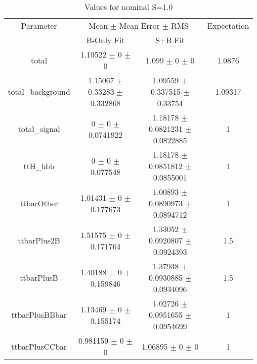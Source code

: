 \begin{table}
\centering
\caption{Values for nominal S=1.0}
\begin{tabular}{cccc}
\toprule
Parameter & \multicolumn{2}{c}{Mean $\pm$ Mean Error $\pm$ RMS} & Expectation\\
 & B-Only Fit & S+B Fit & \\
\midrule
total & \num{1.10522} $\pm$ \num{0} $\pm$ \num{0} & \num{1.099} $\pm$ \num{0} $\pm$ \num{0} & \num{1.0876}\\
total\_background & \num{1.15067} $\pm$ \num{0.33283} $\pm$ \num{0.332868} & \num{1.09559} $\pm$ \num{0.337515} $\pm$ \num{0.33754} & \num{1.09317}\\
total\_signal & \num{0} $\pm$ \num{0} $\pm$ \num{0.0741922} & \num{1.18178} $\pm$ \num{0.0821231} $\pm$ \num{0.0822885} & \num{1}\\
ttH\_hbb & \num{0} $\pm$ \num{0} $\pm$ \num{0.077548} & \num{1.18178} $\pm$ \num{0.0851812} $\pm$ \num{0.0855001} & \num{1}\\
ttbarOther & \num{1.01431} $\pm$ \num{0} $\pm$ \num{0.177673} & \num{1.00893} $\pm$ \num{0.0890973} $\pm$ \num{0.0894712} & \num{1}\\
ttbarPlus2B & \num{1.51575} $\pm$ \num{0} $\pm$ \num{0.171764} & \num{1.33052} $\pm$ \num{0.0920807} $\pm$ \num{0.0924393} & \num{1.5}\\
ttbarPlusB & \num{1.40188} $\pm$ \num{0} $\pm$ \num{0.159846} & \num{1.37938} $\pm$ \num{0.0930885} $\pm$ \num{0.0934096} & \num{1.5}\\
ttbarPlusBBbar & \num{1.13469} $\pm$ \num{0} $\pm$ \num{0.155174} & \num{1.02726} $\pm$ \num{0.0951655} $\pm$ \num{0.0954699} & \num{1}\\
ttbarPlusCCbar & \num{0.981159} $\pm$ \num{0} $\pm$ \num{0} & \num{1.06895} $\pm$ \num{0} $\pm$ \num{0} & \num{1}\\
\bottomrule
\end{tabular}
\end{table}
